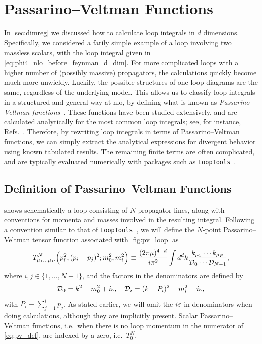 \section{Passarino--Veltman Functions}
In \cref{sec:dimreg} we discussed how to calculate loop integrals in $d$ dimensions.
Specifically, we considered a farily simple example of a loop involving two massless scalars, with the loop integral given in \cref{eq:phi4_nlo_before_feynman_d_dim}.
For more complicated loops with a higher number of (possibly massive) propagators, the calculations quickly become much more unwieldy.
Luckily, the possible structures of one-loop diagrams are the same, regardless of the underlying model.
This allows us to classify loop integrals in a structured and general way at \gls{nlo}, by defining what is known as \emph{Passarino--Veltman functions}~\cite{tHooft:1978jhc,Passarino:1978jh}.
These functions have been studied extensively, and are calculated analytically for the most common loop integrals; see, for instance, Refs.~\cite{Ellis:2007qk,Denner:1991kt}.
Therefore, by rewriting loop integrals in terms of Passarino--Veltman functions, we can simply extract the analytical expressions for divergent behavior using known tabulated results.
The remaining finite terms are often complicated, and are typically evaluated numerically with packages such as \texttt{LoopTools}~\cite{Hahn:1998yk}.

\subsection{Definition of Passarino--Veltman Functions}
 shows schematically a loop consisting of $N$ propagator lines, along with conventions for momenta and masses involved in the resulting integral.
Following a convention similar to that of \texttt{LoopTools}~\cite{Hahn:1998yk}, we will define the $N$-point Passarino--Veltman tensor function associated with \cref{fig:pv_loop} as
\begin{equation}\label{eq:pv_def}
    T_{\mu_1\ldots\mu_P}^N \Bigl( p_i^2, (p_i+p_j)^2; m_0^2, m_i^2 \Bigr)
    \equiv \frac{(2\pi\mu)^{4-d}}{i\pi^2} \int d^dk
    \frac{k_{\mu_1} \cdots k_{\mu_P}}{\mathcal{D}_0\cdots\mathcal{D}_{N-1}},
\end{equation}
where $i,j\in\{1,\ldots,N-1\}$, and the factors in the denominators are defined by
\begin{equation}\label{eq:pv_denominators}
    \mathcal{D}_0 = k^2-m_0^2+i\varepsilon, \quad \mathcal{D}_i = (k + P_i)^2 - m_i^2 + i\varepsilon,
\end{equation}
with $P_i \equiv \sum_{j=1}^i p_j$.
As stated earlier, we will omit the $i\varepsilon$ in denominators when doing calculations, although they are implicitly present.
Scalar Passarino--Veltman functions, i.e.\ when there is no loop momentum in the numerator of \cref{eq:pv_def}, are indexed by a zero, i.e.\ $T_0^N$.

